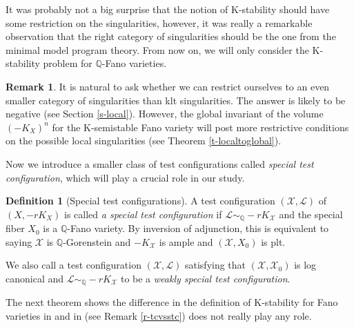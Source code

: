 \documentclass[12pt,reqno]{amsart}%
\newcommand{\cX}{{\mathcal{X}}}
\newcommand{\cL}{{\mathcal{L}}}
\theoremstyle{definition}
\newtheorem{defn}[thm]{Definition}
\newtheorem{rem}[thm]{Remark}
\theoremstyle{remark}
\begin{document}
It was probably not a big surprise that the notion of K-stability should have some restriction on the singularities, however, it was really a remarkable observation that the right category of singularities should be the one from the minimal model program theory.  From now on, we will only consider the K-stability problem for $\mathbb{Q}$-Fano varieties. 

\begin{rem}It is natural to ask whether we can restrict ourselves to an even smaller category of singularities than klt singularities. The answer is likely to be negative (see Section \ref{s-local}). However, the global invariant of the volume $(-K_X)^n$ for the K-semistable Fano variety will post more restrictive conditions on the possible local singularities (see Theorem \ref{t-localtoglobal}). 
\end{rem}

Now we introduce a smaller class of test configurations called {\it special test configuration}, which will play a crucial role in our study.

\begin{defn}[Special test configurations]
\label{d-stc}
A test configuration $(\mathcal{X},\mathcal{L})$ of $(X,-rK_{X})$ is called {\it a special test configuration} if $\mathcal{L}\sim_{\mathbb{Q}}-rK_{\cX}$ and the special fiber $X_0$ is a $\mathbb{Q}$-Fano variety. By inversion of adjunction, this is equivalent to saying $\mathcal{X}$ is $\mathbb{Q}$-Gorenstein and $-K_{\mathcal{X} }$ is ample and $(\mathcal{X},X_0)$ is plt. 

We also call a test configuration $(\cX,\cL)$ satisfying that $(\cX,\cX_0)$ is log canonical and $\cL\sim_{\mathbb{Q}}-rK_{\cX}$ to be a {\it weakly special test configuration}.
\end{defn}

The next theorem shows the difference in the definition of K-stability for Fano varieties in \cite{Tia97} and in \cite{Don02} (see Remark \ref{r-tcvsstc})  does not really play any role.

\end{document}
